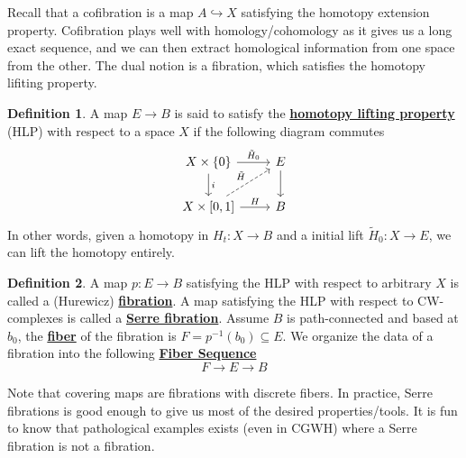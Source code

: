 \documentclass{article}
\theoremstyle{definition}
\theoremstyle{definition}
\theoremstyle{definition}
\theoremstyle{definition}
\theoremstyle{definition}
\newtheorem{definition}{Definition}[section]
\theoremstyle{definition}
\theoremstyle{definition}
\begin{document}
Recall that a cofibration is a map $A\hookrightarrow X$ satisfying the homotopy extension property. Cofibration plays well with homology/cohomology as it gives us a long exact sequence, and we can then extract homological information from one space from the other. The dual notion is a fibration, which satisfies the homotopy lifiting property.

\begin{tcolorbox}[colback=purple!5!white,colframe=purple!75!black]
\begin{definition}
A map $E\to B$ is said to satisfy the \underline{\textbf{homotopy lifting property}} (HLP) with respect to a space $X$ if the following diagram commutes
\[
\begin{tikzcd}
X\times \{0\}\arrow[r,"\tilde{H}_0"]\arrow[d,"i"]&E\arrow[d]\\
X\times [0,1]\arrow[r,"H"]\arrow[ur,dashed,"\tilde{H}"]&B
\end{tikzcd}    
\]
In other words, given a homotopy in $H_t: X\to B$ and a initial lift $\tilde{H}_0: X\to E$, we can lift the homotopy entirely.
\end{definition}
\end{tcolorbox}

\begin{tcolorbox}[colback=purple!5!white,colframe=purple!75!black]
\begin{definition}
A map $p:E\to B$ satisfying the HLP with respect to arbitrary $X$ is called a (Hurewicz)  \underline{\textbf{fibration}}. A map satisfying the HLP with respect to CW-complexes is called a \underline{\textbf{Serre fibration}}. Assume $B$ is path-connected and based at $b_0$, the \underline{\textbf{fiber}} of the fibration is $F=p^{-1}(b_0)\subseteq E$. We organize the data of a fibration into the following \underline{\textbf{Fiber Sequence}}
\[F\to E\to B\]
\end{definition}
\end{tcolorbox}
Note that covering maps are fibrations with discrete fibers. In practice, Serre fibrations is good enough to give us most of the desired properties/tools. It is fun to know that pathological examples exists (even in CGWH) where a Serre fibration is not a fibration. 
\end{document}
